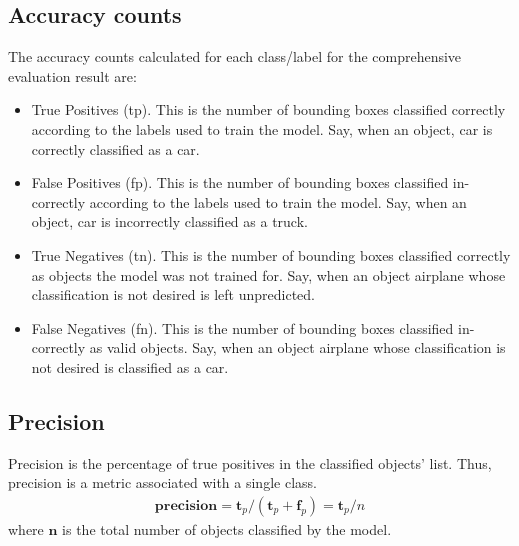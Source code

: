 \documentclass[conference]{IEEEtran}
\begin{document}

\subsection{Accuracy counts}
The accuracy counts calculated for each class/label for the comprehensive evaluation result are:
\begin{itemize}
	\item True Positives (tp). 
	This is the number of bounding boxes classified correctly according to the labels used to train the model. Say, when an object, car is correctly classified as a car.
	\item False Positives (fp).
	This is the number of bounding boxes classified in-correctly according to the labels used to train the model. Say, when an object, car is incorrectly classified as a truck.
	\item True Negatives (tn).
	This is the number of bounding boxes classified correctly as objects the model was not trained for. Say, when an object airplane whose classification is not desired is left unpredicted.
	\item False Negatives (fn).
	This is the number of bounding boxes classified in-correctly as valid objects. Say, when an object airplane whose classification is not desired is classified as a car.
\end{itemize}

\subsection{Precision}
	Precision is the percentage of true positives in the classified objects' list. Thus, precision is a metric associated with a single class.
	\begin{align}
	\mathbf{precision}=\mathbf{t}_p / (\mathbf{t}_p + \mathbf{f}_p) = \mathbf{t}_p / {n}
	\end{align}
	where $\mathbf{n}$ is the total number of objects classified by the model.
\end{document}
